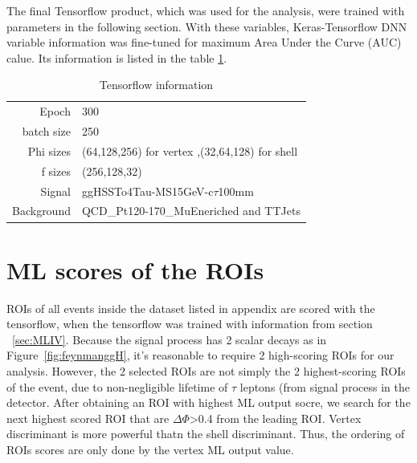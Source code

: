 The final Tensorflow product, which was used for the analysis, were trained with parameters in the following section. 
With these variables, Keras-Tensorflow DNN variable information was fine-tuned for maximum Area Under the Curve (AUC) calue.
Its information is listed in the table \ref{tab:ROIParam}.
\begin{table}[htb]
\caption{Tensorflow information}
\begin{center}
\begin{tabular}{r|l}\hline
Epoch & 300 \\
batch size & 250 \\
Phi sizes & (64,128,256) for vertex ,(32,64,128) for shell \\
f sizes & (256,128,32) \\
Signal & ggHSSTo4Tau-MS15GeV-c$\tau$100mm  \\
Background & QCD\_Pt120-170\_MuEneriched and TTJets \\
 \hline
 \hline
\end{tabular}
\label{tab:ROIParam}
\end{center}
\end{table}


\section{ML scores of the ROIs}

ROIs of all events inside the dataset listed in appendix are scored with the tensorflow, when the tensorflow was trained with information from section ~\ref{sec:MLIV}.
Because the signal process has 2 scalar decays as in Figure~\ref{fig:feynmanggH}, it's reasonable to require 2 high-scoring ROIs for our analysis.
However, the 2 selected ROIs are not simply the 2 highest-scoring ROIs of the event, due to non-negligible lifetime of $\tau$ leptons (from signal process in the detector.
After obtaining an ROI with highest ML output socre, we search for the next highest scored ROI that are $\Delta\Phi$>0.4 from the leading ROI.
Vertex discriminant is more powerful thatn the shell discriminant.
Thus, the ordering of ROIs scores are only done by the vertex ML output value.

